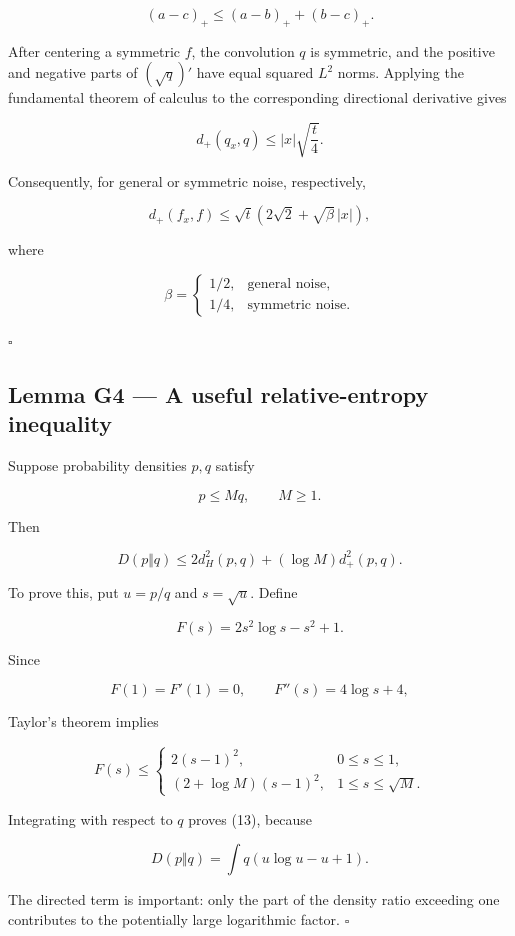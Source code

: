 \documentclass[11pt]{article}
\begin{document}
\[
(a-c)_+\leq(a-b)_++(b-c)_+.
\]

After centering a symmetric \(f\), the convolution \(q\) is symmetric, and the positive and negative parts of \((\sqrt q)'\) have equal squared \(L^2\) norms. Applying the fundamental theorem of calculus to the corresponding directional derivative gives

\[
d_+(q_x,q)\leq |x|\sqrt{\frac t4}.
\]

Consequently, for general or symmetric noise, respectively,

\[
\boxed{
d_+(f_x,f)
\leq
\sqrt t\left(2\sqrt2+\sqrt\beta\,|x|\right),
}
\tag{12}
\]

where

\[
\beta=
\begin{cases}
1/2,&\text{general noise},\\
1/4,&\text{symmetric noise}.
\end{cases}
\]

\(\square\)

\subsection{Lemma G4 --- A useful relative-entropy inequality}

Suppose probability densities \(p,q\) satisfy

\[
p\leq Mq,\qquad M\geq1.
\]

Then

\[
\boxed{
D(p\Vert q)
\leq
2d_H^2(p,q)+(\log M)d_+^2(p,q).
}
\tag{13}
\]

To prove this, put \(u=p/q\) and \(s=\sqrt u\). Define

\[
F(s)=2s^2\log s-s^2+1.
\]

Since

\[
F(1)=F'(1)=0,\qquad
F''(s)=4\log s+4,
\]

Taylor's theorem implies

\[
F(s)\leq
\begin{cases}
2(s-1)^2,&0\leq s\leq1,\\
(2+\log M)(s-1)^2,&1\leq s\leq\sqrt M.
\end{cases}
\]

Integrating with respect to \(q\) proves (13), because

\[
D(p\Vert q)=\int q(u\log u-u+1).
\]

The directed term is important: only the part of the density ratio exceeding one contributes to the potentially large logarithmic factor. \(\square\)
\end{document}
